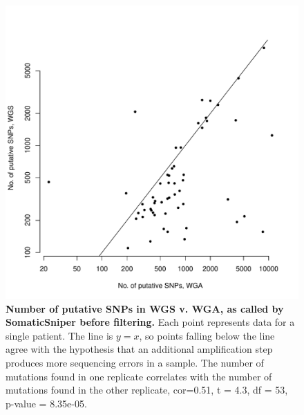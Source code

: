 \documentclass[11pt]{article} %
\begin{document}
\begin{figure}
\centerline{
\includegraphics[width=5in]{C282_v_C484.pdf} }
\caption{\textbf{Number of putative SNPs in WGS v. WGA, as called by SomaticSniper before filtering.} Each point represents data for a single patient. The line is $y=x$, so points falling below the line agree with the hypothesis that an additional amplification step produces more sequencing errors in a sample. The number of mutations found in one replicate correlates with the number of mutations found in the other replicate, cor=0.51, t = 4.3, df = 53, p-value = 8.35e-05.}
\end{figure}
\end{document}
